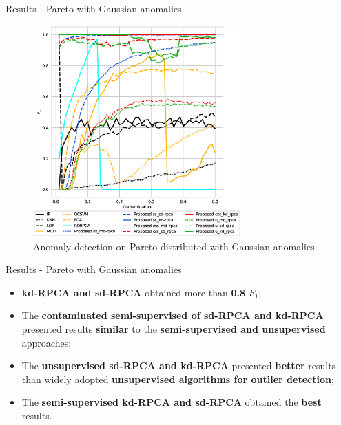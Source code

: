 \documentclass[newPxFont, numfooter, sectionpages]{beamer}
\begin{document}
\begin{frame}[c]{Results - Pareto with Gaussian anomalies}
    \begin{figure}[h!]
    	\centering
    	\includegraphics[width=8cm]{figures/ch4/pareto_f1_contamination.eps}
    	\caption{Anomaly detection on Pareto distributed with Gaussian anomalies}
    	\label{fig:4.11}
    \end{figure}
\end{frame}

\begin{frame}[c]{Results - Pareto with Gaussian anomalies}
	\begin{itemize}
		\item \textbf{kd-RPCA and sd-RPCA} obtained more than \textbf{0.8} $F_1$;
		\item The \textbf{contaminated semi-supervised of sd-RPCA and kd-RPCA} presented results \textbf{similar} to the \textbf{semi-supervised and unsupervised} approaches;
		\item The \textbf{unsupervised sd-RPCA and kd-RPCA} presented \textbf{better} results than widely adopted \textbf{unsupervised algorithms for outlier detection};
		\item The \textbf{semi-supervised kd-RPCA and sd-RPCA} obtained the \textbf{best} results.
	\end{itemize}
\end{frame}
\end{document}
